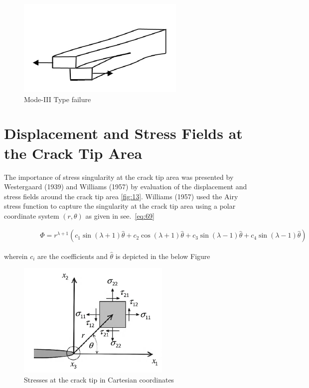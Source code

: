 \documentclass[fleqn, 12.5pt,a4paper]{report}
\begin{document}
\begin{figure}[h]
    \centering
    \includegraphics[scale = 0.8]{M3.png}
    \caption{{Mode-III Type failure \cite{kuna2013finite}}}
    \label{fig:12}
\end{figure}

\section{ \large{Displacement and Stress Fields at the Crack Tip Area}}

The importance of stress singularity at the crack tip area was presented by Westergaard (1939) and Williams (1957) by evaluation of the displacement and stress fields around the crack tip area \autoref{fig:13}. Williams (1957) used the Airy stress function to capture the singularity at the crack tip area using a polar coordinate system \cite{khoei2014extended} $(r, \theta)$ as given in see.~\autoref{eq:69}

\begin{align}\label{eq:69}
\hspace{2cm}\Phi = r^{\lambda+1} (c_1 \sin(\lambda+1)\hat{\theta} + c_2 \cos(\lambda+1)\hat{\theta} + c_3 \sin(\lambda-1)\hat{\theta} + c_4 \sin(\lambda-1)\hat{\theta})
\end{align}

wherein $c_i$ are the coefficients and $\hat{\theta}$ is depicted in the below Figure
\begin{figure}[h]
    \centering
    \includegraphics[scale = 1]{stress.PNG}
    \caption{{Stresses at the crack tip in Cartesian coordinates     \cite{kuna2013finite}}}
    \label{fig:13}
    \centering
\end{figure}
\end{document}
